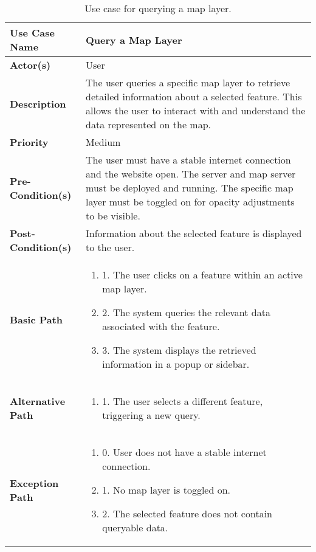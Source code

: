 \begin{table}[h]
    \centering
    \renewcommand{\arraystretch}{1.5}
    \begin{tabularx}{\textwidth}{|l|X|}
        \hline
        \rowcolor{gray!20}
        \textbf{Use Case Name} & Query a Map Layer \\
        \hline
        \textbf{Actor(s)} & User \\
        \hline
        \textbf{Description} & The user queries a specific map layer to retrieve detailed information about a selected feature. This allows the user to interact with and understand the data represented on the map. \\        \hline
        \textbf{Priority} & Medium \\
        \hline
        \textbf{Pre-Condition(s)} & The user must have a stable internet connection and the website open. The server and map server must be deployed and running. The specific map layer must be toggled on for opacity adjustments to be visible. \\
        \hline
        \textbf{Post-Condition(s)} & Information about the selected feature is displayed to the user. \\
        \hline
        \textbf{Basic Path} &  
        \begin{enumerate}[label=,left=0pt]
            \item 1. The user clicks on a feature within an active map layer.
            \item 2. The system queries the relevant data associated with the feature.
            \item 3. The system displays the retrieved information in a popup or sidebar.
        \end{enumerate} \\
        \hline
        \textbf{Alternative Path} & 
        \begin{enumerate}[label=,left=0pt]
            \item 1. The user selects a different feature, triggering a new query.
        \end{enumerate} \\
        \hline
        \textbf{Exception Path} & 
        \begin{enumerate}[label=,left=0pt]
            \item 0. User does not have a stable internet connection.
            \item 1. No map layer is toggled on.
            \item 2. The selected feature does not contain queryable data.
        \end{enumerate} \\
        \hline
    \end{tabularx}
    \caption[Use Case Specification: Query a Map Layer]{Use case for querying a map layer.}
    \label{tab:use_case_query_map_appendix}
\end{table}

